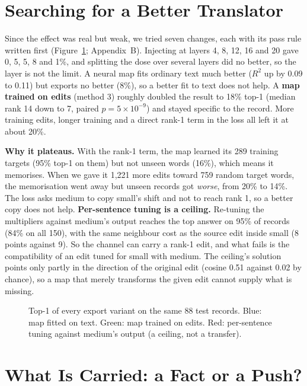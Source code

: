 \section{Searching for a Better Translator}\label{sec:search}

Since the effect was real but weak, we tried seven changes, each with its pass rule written first (Figure~\ref{fig:ladder}; Appendix~B). Injecting at layers 4, 8, 12, 16 and 20 gave 0, 5, 5, 8 and 1\%, and splitting the dose over several layers did no better, so the layer is not the limit. A neural map fits ordinary text much better ($R^2$ up by 0.09 to 0.11) but exports no better (8\%), so a better fit to text does not help. A \textbf{map trained on edits} (method 3) roughly doubled the result to 18\% top-1 (median rank 14 down to 7, paired $p=5\times10^{-9}$) and stayed specific to the record. More training edits, longer training and a direct rank-1 term in the loss all left it at about 20\%.

\textbf{Why it plateaus.} With the rank-1 term, the map learned its 289 training targets (95\% top-1 on them) but not unseen words (16\%), which means it memorises. When we gave it 1,221 more edits toward 759 random target words, the memorisation went away but unseen records got \emph{worse}, from 20\% to 14\%. The loss asks medium to copy small's shift and not to reach rank 1, so a better copy does not help. \textbf{Per-sentence tuning is a ceiling.} Re-tuning the multipliers against medium's output reaches the top answer on 95\% of records (84\% on all 150), with the same neighbour cost as the source edit inside small (8 points against 9). So the channel can carry a rank-1 edit, and what fails is the compatibility of an edit tuned for small with medium. The ceiling's solution points only partly in the direction of the original edit (cosine 0.51 against 0.02 by chance), so a map that merely transforms the given edit cannot supply what is missing.

\begin{figure}[t]
\centering
{}
\caption{Top-1 of every export variant on the same 88 test records. Blue: map fitted on text. Green: map trained on edits. Red: per-sentence tuning against medium's output (a ceiling, not a transfer).}\label{fig:ladder}
\end{figure}

\section{What Is Carried: a Fact or a Push?}\label{sec:push}

